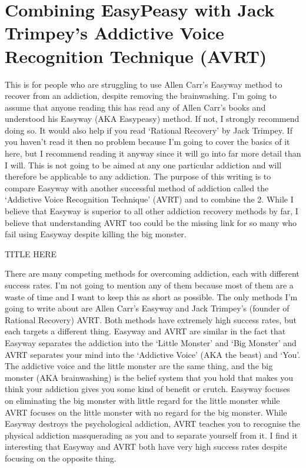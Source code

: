 \documentclass[
]{book}
\begin{document}
\hypertarget{combining-easypeasy-with-jack-trimpeys-addictive-voice-recognition-technique-avrt}{%
\section{Combining EasyPeasy with Jack Trimpey's Addictive Voice Recognition Technique (AVRT)}\label{combining-easypeasy-with-jack-trimpeys-addictive-voice-recognition-technique-avrt}}

This is for people who are struggling to use Allen Carr's Easyway method to recover from an addiction, despite removing the brainwashing. I'm going to assume that anyone reading this has read any of Allen Carr's books and understood his Easyway (AKA Easypeasy) method. If not, I strongly recommend doing so. It would also help if you read `Rational Recovery' by Jack Trimpey. If you haven't read it then no problem because I'm going to cover the basics of it here, but I recommend reading it anyway since it will go into far more detail than I will. This is not going to be aimed at any one particular addiction and will therefore be applicable to any addiction. The purpose of this writing is to compare Easyway with another successful method of addiction called the `Addictive Voice Recognition Technique' (AVRT) and to combine the 2. While I believe that Easyway is superior to all other addiction recovery methods by far, I believe that understanding AVRT too could be the missing link for so many who fail using Easyway despite killing the big monster.

TITLE HERE

There are many competing methods for overcoming addiction, each with different success rates. I'm not going to mention any of them because most of them are a waste of time and I want to keep this as short as possible. The only methods I'm going to write about are Allen Carr's Easyway and Jack Trimpey's (founder of Rational Recovery) AVRT. Both methods have extremely high success rates, but each targets a different thing. Easyway and AVRT are similar in the fact that Easyway separates the addiction into the `Little Monster' and `Big Monster' and AVRT separates your mind into the `Addictive Voice' (AKA the beast) and `You'. The addictive voice and the little monster are the same thing, and the big monster (AKA brainwashing) is the belief system that you hold that makes you think your addiction gives you some kind of benefit or crutch. Easyway focuses on eliminating the big monster with little regard for the little monster while AVRT focuses on the little monster with no regard for the big monster. While Easyway destroys the psychological addiction, AVRT teaches you to recognise the physical addiction masquerading as you and to separate yourself from it. I find it interesting that Easyway and AVRT both have very high success rates despite focusing on the opposite thing.
\end{document}
